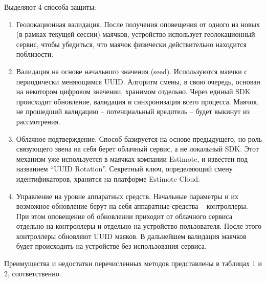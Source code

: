 Выделяют 4 способа защиты:

\begin{enumerate}
    \item
    Геолокационная валидация. После получения оповещения от одного из новых (в рамках текущей сессии) маячков, устройство использует геолокационный сервис, чтобы убедиться, что маячок физически действительно находится поблизости.
    \item
    Валидация на основе начального значения (seed). Используются маячки с периодически меняющимся UUID. Алгоритм смены, в свою очередь, основан на некотором цифровом значении, хранимом отдельно. Через единый SDK происходит обновление, валидация и синхронизация всего процесса. Маячок, не прошедший валидацию – потенциальный вредитель – будет выкинут из рассмотрения.
    \item
    Облачное подтверждение. Способ базируется на основе предыдущего, но роль связующего звена на себя берет облачный сервис, а не локальный SDK. 
Этот механизм уже используется в маячках компании Estimote, и известен под названием “UUID Rotation”. Секретный ключ, определяющий смену идентификаторов, хранится на платформе Estimote Cloud.
    \item
    Управление на уровне аппаратных средств. Начальные параметры и их возможное обновление берут на себя аппаратные средства – контроллеры. При этом оповещение об обновлении приходит от облачного сервиса отдельно на контроллеры и отдельно на устройство пользователя. После этого контроллеры обновляют UUID маяков. В дальнейшем валидация маячков будет происходить на устройстве без использования сервиса.
\end{enumerate}

Преимущества и недостатки перечисленных методов представлены в таблицах 1 и 2, соответственно.


